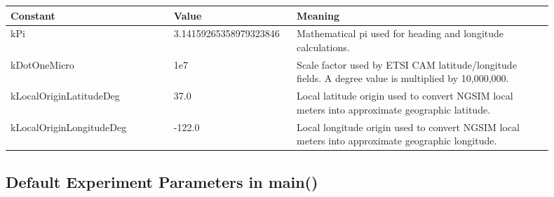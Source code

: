 \documentclass[11pt]{article}
\DeclareRobustCommand{\code}[1]{\texttt{\detokenize{#1}}}
\def\code#1{#1}%
\begin{document}
\begin{center}
\begin{tabular}{L{0.28\linewidth}L{0.18\linewidth}L{0.44\linewidth}}
\toprule
Constant & Value & Meaning \\
\midrule
\code{kPi} & \code{3.14159265358979323846} &
Mathematical pi used for heading and longitude calculations. \\
\code{kDotOneMicro} & \code{1e7} &
Scale factor used by ETSI CAM latitude/longitude fields.  A degree value is
multiplied by 10,000,000. \\
\code{kLocalOriginLatitudeDeg} & \code{37.0} &
Local latitude origin used to convert NGSIM local meters into approximate
geographic latitude. \\
\code{kLocalOriginLongitudeDeg} & \code{-122.0} &
Local longitude origin used to convert NGSIM local meters into approximate
geographic longitude. \\
\bottomrule
\end{tabular}
\end{center}

\subsection{Default Experiment Parameters in \code{main()}}
\end{document}

